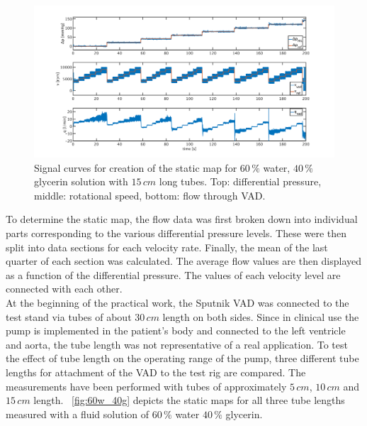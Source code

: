 \begin{figure}[ht]
  \centering
  \includegraphics[width=\textwidth]{images/plots_syst_ident/Test_60w40g_long.pdf}
  \caption[Signal curves for creation of the static map.]{Signal curves for creation of the static map for $60\,\%$ water, $40\,\%$ glycerin solution with $15 \, cm$ long tubes. Top: differential pressure, middle: rotational speed, bottom: flow through VAD.}
  \label{fig:test_60w40g_long}
\end{figure}
To determine the static map, the flow data was first broken down into individual parts corresponding to the various differential pressure levels.  These were then split into data sections for each velocity rate. Finally, the mean of the last quarter of each section was calculated. The average flow values are then displayed as a function of the differential pressure. The values of each velocity level are connected with each other.
\\At the beginning of the practical work, the Sputnik VAD was connected to the test stand via tubes of about $30\, cm$ length on both sides. Since in clinical use the pump is implemented in the patient's body and connected to the left ventricle and aorta, the tube length was not representative of a real application. To test the effect of tube length on the operating range of the pump, three different tube lengths for attachment of the VAD to the test rig are compared. The measurements have been performed with tubes of approximately $5\, cm$, $10\, cm$ and $15\, cm$ length. \figurename~\ref{fig:60w_40g} depicts the static maps for all three tube lengths measured with a fluid solution of $60\, \%$ water $40\, \%$ glycerin.
